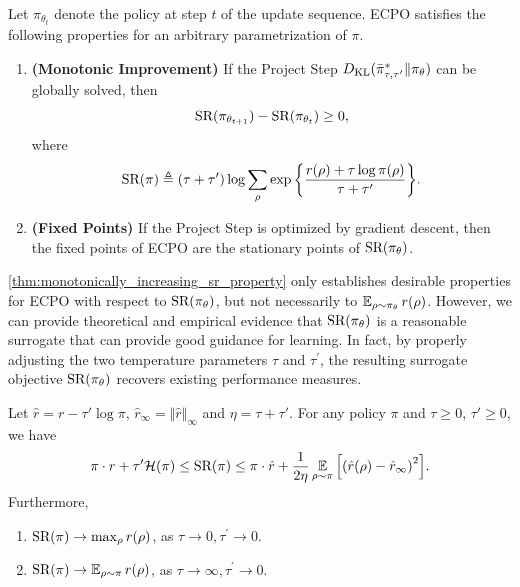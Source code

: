 \begin{thm}
\label{thm:monotonically_increasing_sr_property}
Let $\pi_{\theta_{t}}$ denote the policy at step $t$ of the update
sequence.
ECPO satisfies the following properties for an arbitrary parametrization of $\pi$.
\begin{enumerate}
	\item {\bf (Monotonic Improvement)} 
	If the Project Step $D_{\mathrm{KL}}( \bar{\pi}_{\tau,\tau^{\prime}}^* \| \pi_\theta )$ can be globally solved,
then 
	\begin{equation*}
	\text{SR}(\pi_{\theta_{t+1}}) - \text{SR}(\pi_{\theta_t})\ge 0,
	\end{equation*}
	where
	{\small
	\begin{equation}
	\label{eq:SR}
	\text{SR}(\pi) \triangleq (\tau + \tau^{\prime})\log{ \sum_{\rho}{ \exp\left\{ \frac{r(\rho) + \tau \log{\pi(\rho)} }{\tau + \tau^{\prime}} \right\} }}.
	\end{equation}
	}
	\item {\bf (Fixed Points)} If the Project Step is optimized by gradient descent, then the fixed points of ECPO are the 
	stationary points of $\text{SR}(\pi_\theta)$. 
\end{enumerate}
\end{thm}
\noindent \cref{thm:monotonically_increasing_sr_property} only establishes
desirable properties for ECPO with respect to $\text{SR}(\pi_\theta)$,
but not necessarily to $\operatorname*{\mathbb{E}}_{\rho\sim \pi_\theta}{r(\rho)}$. However, we can provide
theoretical and empirical evidence that
$\text{SR}(\pi_\theta)$ is a reasonable surrogate 
that can provide good guidance for learning.
In fact, by properly adjusting the two temperature parameters $\tau$ and
$\tau^{\prime}$,
the resulting surrogate objective $\text{SR}(\pi_\theta)$
recovers existing performance measures.

\begin{lem}
\label{lem:sr}
Let $\hat{r}=r-\tau' \log\pi$, $\hat{r}_\infty = \Vert \hat{r} \Vert_\infty$ and $\eta = \tau+\tau'$. For any policy $\pi$ and $\tau\geq 0$, $\tau'\geq 0$, we have
\begin{align*}
\pi\cdot r + \tau' \mathcal{H}(\pi) \leq \text{SR}(\pi) \leq  \pi\cdot \hat{r} + \frac{1}{2\eta} \operatorname*{\mathbb{E}}_{\rho\sim \pi}{\left[\left( \hat{r}(\rho) - \hat{r}_\infty \right)^2 \right]}.
\end{align*}
Furthermore, 
\begin{enumerate}[label=(\roman*)]
	\item  $\text{SR}(\pi) \to \max_{\rho}{r(\rho)}$, as $\tau \to 0, \tau^{\prime} \to 0$.
	\item $\text{SR}(\pi) \to \operatorname*{\mathbb{E}}_{\rho \sim \pi}{r(\rho)}$, as $\tau \to \infty, \tau^{\prime} \to 0$. 
\end{enumerate}
\end{lem}


